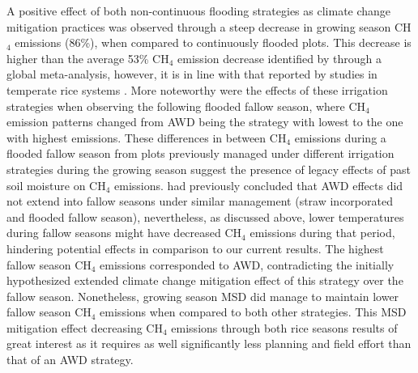 A positive effect of both non-continuous flooding strategies as climate change mitigation practices was observed through a steep decrease in growing season CH$_{4}$ emissions (86\%), when compared to continuously flooded plots. This decrease is higher than the average 53\% CH$_{4}$ emission decrease identified by \cite{jiang2019} through a global meta-analysis, however, it is in line with that reported by studies in temperate rice systems \citep{linquist2015, lahue2016}. More noteworthy were the effects of these irrigation strategies when observing the following flooded fallow season, where CH$_{4}$ emission patterns changed from AWD being the strategy with lowest to the one with highest emissions. These differences in between CH$_{4}$ emissions during a flooded fallow season from plots previously managed under different irrigation strategies during the growing season suggest the presence of legacy effects of past soil moisture on CH$_{4}$ emissions. \cite{lahue2016} had previously concluded that AWD effects did not extend into fallow seasons under similar management (straw incorporated and flooded fallow season), nevertheless, as discussed above, lower temperatures during fallow seasons might have decreased CH$_{4}$ emissions during that period, hindering potential effects in comparison to our current results. The highest fallow season CH$_{4}$ emissions corresponded to AWD, contradicting the initially hypothesized extended climate change mitigation effect of this strategy over the fallow season. Nonetheless, growing season MSD did manage to maintain lower fallow season CH$_{4}$ emissions when compared to both other strategies. This MSD mitigation effect decreasing CH$_{4}$ emissions through both rice seasons results of great interest as it requires as well significantly less planning and field effort than that of an AWD strategy.\\ 

